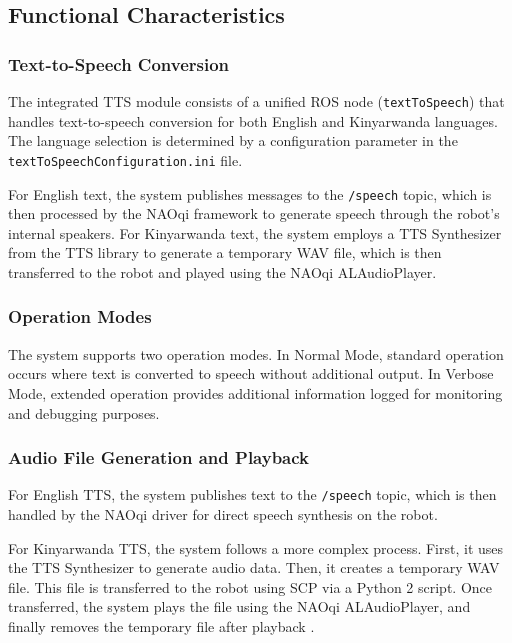 \documentclass{CSSRforAfrica}
\begin{document}
\subsection{Functional Characteristics}

\subsubsection{Text-to-Speech Conversion}

The integrated TTS module consists of a unified ROS node (\texttt{textToSpeech}) that handles text-to-speech conversion for both English and Kinyarwanda languages. The language selection is determined by a configuration parameter in the \texttt{textToSpeechConfiguration.ini} file.

For English text, the system publishes messages to the \texttt{/speech} topic, which is then processed by the NAOqi framework to generate speech through the robot's internal speakers. For Kinyarwanda text, the system employs a TTS Synthesizer from the TTS library to generate a temporary WAV file, which is then transferred to the robot and played using the NAOqi ALAudioPlayer.

\subsubsection{Operation Modes}

The system supports two operation modes. In Normal Mode, standard operation occurs where text is converted to speech without additional output. In Verbose Mode, extended operation provides additional information logged for monitoring and debugging purposes.

\subsubsection{Audio File Generation and Playback}

For English TTS, the system publishes text to the \texttt{/speech} topic, which is then handled by the NAOqi driver for direct speech synthesis on the robot.

For Kinyarwanda TTS, the system follows a more complex process. First, it uses the TTS Synthesizer to generate audio data. Then, it creates a temporary WAV file. This file is transferred to the robot using SCP via a Python 2 script. Once transferred, the system plays the file using the NAOqi ALAudioPlayer, and finally removes the temporary file after playback \cite{casanova2022yourtts}.
\end{document}

